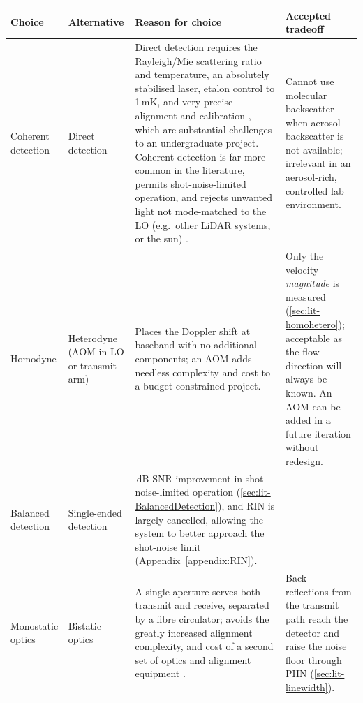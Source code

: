 \begin{table}[H]
	\centering
	\footnotesize
	\setlength{\tabcolsep}{4pt}
	\renewcommand{\arraystretch}{1.15}
	\begin{tabular}{@{}>{\raggedright\arraybackslash}p{}
			>{\raggedright\arraybackslash}p{}
			>{\raggedright\arraybackslash}p{}
			>{\raggedright\arraybackslash}p{}@{}}
		\toprule
		\textbf{Choice} & \textbf{Alternative} & \textbf{Reason for choice} & \textbf{Accepted tradeoff} \\
		\midrule
		Coherent detection & Direct detection &
		Direct detection requires the Rayleigh/Mie scattering ratio and temperature, an absolutely stabilised laser, etalon control to 1\,mK, and very precise alignment and calibration \cite{korb_theory_1998,colberg_diode-laser-based_2026,werner_doppler_2005}, which are substantial challenges to an undergraduate project. Coherent detection is far more common in the literature, permits shot-noise-limited operation, and rejects unwanted light not mode-matched to the LO (e.g.\ other LiDAR systems, or the sun) \cite{hill_remote_nodate}. &
		Cannot use molecular backscatter when aerosol backscatter is not available; irrelevant in an aerosol-rich, controlled lab environment. \\
		\addlinespace[3pt]
		Homodyne & Heterodyne (AOM in LO or transmit arm) \cite{harris_role_1998,abdelazim_development_2015} &
		Places the Doppler shift at baseband with no additional components; an AOM adds needless complexity and cost to a budget-constrained project. &
		Only the velocity \emph{magnitude} is measured (\autoref{sec:lit-homohetero}); acceptable as the flow direction will always be known. An AOM can be added in a future iteration without redesign. \\
		\addlinespace[3pt]
		Balanced detection & Single-ended detection &
		3\,dB SNR improvement in shot-noise-limited operation (\autoref{sec:lit-BalancedDetection}), and RIN is largely cancelled, allowing the system to better approach the shot-noise limit (Appendix~\ref{appendix:RIN}). &
		-- \\
		\addlinespace[3pt]
		Monostatic optics & Bistatic optics &
		A single aperture serves both transmit and receive, separated by a fibre circulator; avoids the greatly increased alignment complexity, and cost of a second set of optics and alignment equipment \cite{cariou2006laser,harris_role_1998,bennett_doppler_2003}. &
		Back-reflections from the transmit path reach the detector and raise the noise floor through PIIN (\autoref{sec:lit-linewidth}). \\

\end{tabular}
\end{table}
